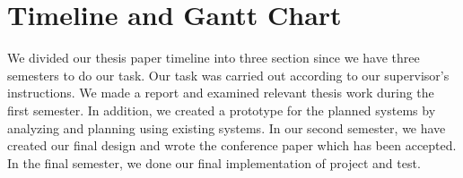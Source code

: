 \documentclass[12pt]{ucthesis}
\begin{document}
    
    
\label{Challanges}
    
 


    
    

\section{Timeline and Gantt Chart}
\label{timeline}
    
 We divided our thesis paper timeline into three section since we have three semesters to do our task. Our task was carried out according to our supervisor's instructions. We made a report and examined relevant thesis work during the first semester. In addition, we created a prototype for the planned systems by analyzing and planning using existing systems. In our second semester, we have created our final design and wrote the conference paper which has been accepted. In the final semester, we done our final implementation of project and test. 
\end{document}
